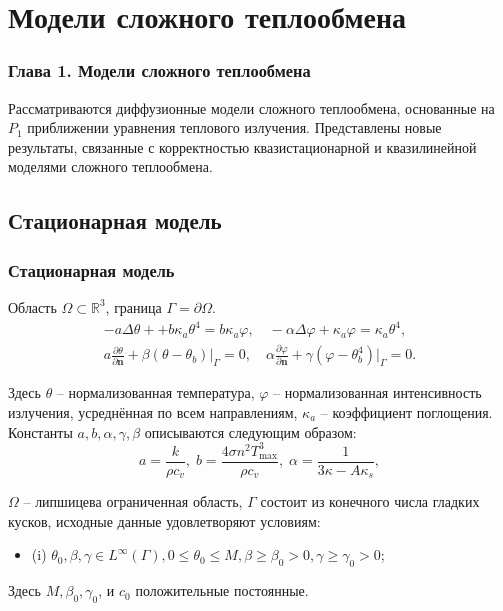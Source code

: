 \section{Модели сложного теплообмена}\label{sec:$p_1$}
\begin{frame}
    \frametitle{Глава 1. Модели сложного теплообмена}
    Рассматриваются диффузионные модели сложного теплообмена, основанные
    на $P_1$ приближении уравнения теплового излучения.
    Представлены новые результаты, связанные с корректностью квазистационарной
    и квазилинейной моделями сложного теплообмена.
\end{frame}

\subsection{Стационарная модель}\label{subsec:st}
\begin{frame}
    \frametitle{Стационарная модель}
    Область $\Omega \subset \mathbb{R}^3$, граница  $\Gamma = \partial \Omega$.
    \begin{gather}
        -a \Delta \theta + + b \kappa_a \theta^4 =  b \kappa_a \varphi,
        \quad
        - \alpha \Delta \varphi + \kappa_a \varphi = \kappa_a \theta^4,  \label{eq:pres:1}\\
        a \frac{\partial \theta}{\partial \mathbf{n}}
        +\left.\beta\left(\theta-\theta_{b}\right)\right|_{\Gamma}=0,
        \quad
        \alpha \frac{\partial \varphi}{\partial \mathbf{n}} + \gamma
        (\varphi-\theta_b^4)|_{\Gamma} = 0. \label{eq:pres:2}
    \end{gather}

    Здесь $\theta$ -- нормализованная температура, $\varphi$ -- нормализованная интенсивность излучения,
    усреднённая по всем направлениям, $\kappa_a$ -- коэффициент поглощения.
    Константы $a, b, \alpha, \gamma, \beta$ описываются следующим образом:
    \[
        a = \frac{k}{\rho c_v}, \; b = \frac{4 \sigma n^2 T^3_{\max}}{\rho c_v}, \;
        \alpha = \frac{1}{3\kappa -A \kappa_s},
    \]



    $\Omega$ -- липшицева ограниченная область, $\Gamma$ состоит из конечного числа гладких кусков,
    исходные данные удовлетворяют условиям:
    \begin{itemize}
        \item (i) $\theta_{0}, \beta, \gamma \in L^{\infty}(\Gamma),
        0 \leqslant \theta_{0} \leqslant M, \beta \geqslant \beta_{0}>0, \gamma \geqslant \gamma_{0}>0$;
    \end{itemize}
    Здесь $M, \beta_{0}, \gamma_{0}$, и $c_{0}$ положительные постоянные.
\end{frame}

